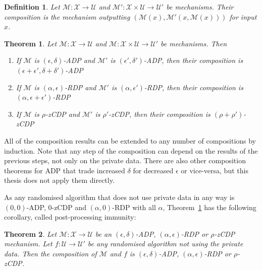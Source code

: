 \documentclass[english,twoside,openright]{HYgraduMLDS}
\newtheorem{theorem}{Theorem}
\newtheorem{definition}{Definition}
\newcommand{\calm}{{\mathcal{M}}}
\newcommand{\calx}{{\mathcal{X}}}
\newcommand{\calu}{{\mathcal{U}}}
\begin{document}
\begin{definition}\label{composition_definition}
    Let \(\calm\colon \calx \to \calu\) and 
    \(\calm'\colon \calx\times \calu \to \calu'\) be mechanisms.
    Their composition is the mechanism outputting
    \((\calm(x), \calm'(x, \calm(x)))\) for input \(x\).
\end{definition}

\begin{theorem}\label{composition-theorem}
    Let \(\calm\colon \calx \to \calu\) and 
    \(\calm\colon \calx\times \calu \to \calu'\) be mechanisms. Then
    \begin{enumerate}
        \item 
            If \(\calm\) is \((\epsilon, \delta)\)-ADP and 
            \(\calm'\) is \((\epsilon', \delta')\)-ADP, then 
            their composition is 
            \((\epsilon + \epsilon', \delta + \delta')\)-ADP~\cite{DKM06}
        \item 
            If \(\calm\) is \((\alpha, \epsilon)\)-RDP and 
            \(\calm'\) is \((\alpha, \epsilon')\)-RDP, then 
            their composition is \((\alpha, \epsilon + \epsilon')\)-RDP~\cite{Mironov17}
        \item 
            If \(\calm\) is \(\rho\)-zCDP and 
            \(\calm'\) is \(\rho'\)-zCDP, then 
            their composition is \((\rho + \rho')\)-zCDP~\cite{BuS16}
    \end{enumerate}
\end{theorem}

All of the composition results can be extended to any number of compositions 
by induction. Note that any step of the composition can depend on the results 
of the previous steps, not only on the private data. There are also other composition
theorems for ADP that trade increased \(\delta\) for decreased \(\epsilon\)
or vice-versa, but this thesis does not apply them directly.

As any randomised algorithm that does not use private data in any way is
\((0, 0)\)-ADP, 0-zCDP and \((\alpha, 0)\)-RDP with all \(\alpha\), 
Theorem~\ref{composition-theorem} has the following corollary, called 
post-processing immunity:

\begin{theorem}
  Let \(\calm\colon \calx\to \calu\) be an \((\epsilon, \delta)\)-ADP,
  \((\alpha, \epsilon)\)-RDP or \(\rho\)-zCDP mechanism.
  Let \(f\colon \calu\to \calu'\) be any randomised algorithm
  not using the private data. Then the composition of \(\calm\) and \(f\)
  is \((\epsilon, \delta)\)-ADP, \((\alpha, \epsilon)\)-RDP or \(\rho\)-zCDP.
\end{theorem}
\end{document}
